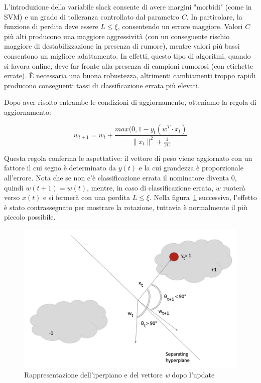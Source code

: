 L'introduzione della variabile slack consente di avere margini "morbidi" (come in SVM) e un grado di tolleranza controllato dal parametro $C$. In particolare, la funzione di perdita deve essere $L \leq \xi$, consentendo un errore maggiore. Valori $C$ più alti producono una maggiore aggressività (con un conseguente rischio maggiore di destabilizzazione in presenza di rumore), mentre valori più bassi consentono un migliore adattamento. In effetti, questo tipo di algoritmi, quando si lavora online, deve far fronte alla presenza di campioni rumorosi (con etichette errate). È necessaria una buona robustezza, altrimenti cambiamenti troppo rapidi producono conseguenti tassi di classificazione errata più elevati.

Dopo aver risolto entrambe le condizioni di aggiornamento, otteniamo la regola di aggiornamento:

$$w_{t+1}=w_t+\frac{max(0,1-y_t(w^T\cdot x_t)}{\|x_t\|^2+\frac{1}{2C}}$$ 

Questa regola conferma le aspettative: il vettore di peso viene aggiornato con un fattore il cui segno è determinato da $y(t)$ e la cui grandezza è proporzionale all'errore. Nota che se non c'è classificazione errata il nominatore diventa $0$, quindi $w(t + 1) = w(t)$, mentre, in caso di classificazione errata, $w$ ruoterà verso $x(t)$ e si fermerà con una perdita $L \leq \xi$. Nella figura~\ref{fig:PAII2} successiva, l'effetto è stato contrassegnato per mostrare la rotazione, tuttavia è normalmente il più piccolo possibile.

\begin{figure}[h]
    \centering
    \includegraphics[scale=0.5]{Figure/PAII2.png}
    \caption{Rappresentazione dell'iperpiano e del vettore \textit{w} dopo l'update}
    \label{fig:PAII2}
\end{figure}
\FloatBarrier  



